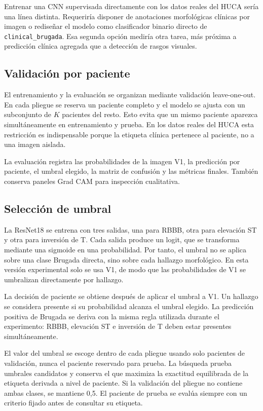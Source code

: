 Entrenar una CNN supervisada directamente con los datos reales del HUCA sería una línea distinta. Requeriría disponer de anotaciones morfológicas clínicas por imagen o rediseñar el modelo como clasificador binario directo de \texttt{clinical\_brugada}. Esa segunda opción mediría otra tarea, más próxima a predicción clínica agregada que a detección de rasgos visuales.

\subsection{Validación por paciente}

El entrenamiento y la evaluación se organizan mediante validación leave-one-out. En cada pliegue se reserva un paciente completo y el modelo se ajusta con un subconjunto de \(K\) pacientes del resto. Esto evita que un mismo paciente aparezca simultáneamente en entrenamiento y prueba. En los datos reales del HUCA esta restricción es indispensable porque la etiqueta clínica pertenece al paciente, no a una imagen aislada.

La evaluación registra las probabilidades de la imagen V1, la predicción por paciente, el umbral elegido, la matriz de confusión y las métricas finales. También conserva paneles Grad CAM para inspección cualitativa.

\subsection{Selección de umbral}

La ResNet18 se entrena con tres salidas, una para RBBB, otra para elevación ST y otra para inversión de T. Cada salida produce un logit, que se transforma mediante una sigmoide en una probabilidad. Por tanto, el umbral no se aplica sobre una clase Brugada directa, sino sobre cada hallazgo morfológico. En esta versión experimental solo se usa V1, de modo que las probabilidades de V1 se umbralizan directamente por hallazgo.

La decisión de paciente se obtiene después de aplicar el umbral a V1. Un hallazgo se considera presente si su probabilidad alcanza el umbral elegido. La predicción positiva de Brugada se deriva con la misma regla utilizada durante el experimento: RBBB, elevación ST e inversión de T deben estar presentes simultáneamente.

El valor del umbral se escoge dentro de cada pliegue usando solo pacientes de validación, nunca el paciente reservado para prueba. La búsqueda prueba umbrales candidatos y conserva el que maximiza la exactitud equilibrada de la etiqueta derivada a nivel de paciente. Si la validación del pliegue no contiene ambas clases, se mantiene 0,5. El paciente de prueba se evalúa siempre con un criterio fijado antes de consultar su etiqueta.

